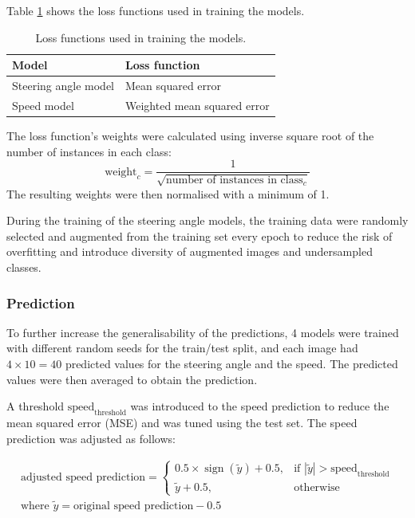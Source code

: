 \documentclass{article}
\begin{document}
Table \ref{tab:loss_functions} shows the loss functions used in training the models.

\begin{table}[H]
  \centering
  \renewcommand{\arraystretch}{1.2}
  \begin{tabular}{|l|l|}
    \hline
    \textbf{Model}       & \textbf{Loss function}      \\
    \hline
    Steering angle model & Mean squared error          \\
    Speed model          & Weighted mean squared error \\
    \hline
  \end{tabular}
  \vspace{0.5em}
  \caption{Loss functions used in training the models.}
  \label{tab:loss_functions}
\end{table}

The loss function's weights were calculated using inverse square root of the number of instances in each class:
\begin{equation}
  \text{weight}_c = \frac{1}{\sqrt{\text{number of instances in class}_c}}
  \label{eq:inverse_square_root}
\end{equation}
The resulting weights were then normalised with a minimum of 1.

During the training of the steering angle models, the training data were randomly selected and augmented from the training set every epoch to reduce the risk of overfitting and introduce diversity of augmented images and undersampled classes.


\subsubsection{Prediction}
To further increase the generalisability of the predictions, 4 models were trained with different random seeds for the train/test split, and each image had \( 4 \times 10 = 40 \) predicted values for the steering angle and the speed. The predicted values were then averaged to obtain the prediction.

A threshold \(\text{speed}_\text{threshold}\) was introduced to the speed prediction to reduce the mean squared error (MSE) and was tuned using the test set. The speed prediction was adjusted as follows:

\begin{equation}
  \begin{aligned}
    \text{adjusted speed prediction} =
    \begin{cases}
      0.5 \times \operatorname{sign}(\tilde{y}) + 0.5, & \text{if } |\tilde{y}| > \text{speed}_\text{threshold} \\
      \tilde{y} + 0.5,                                 & \text{otherwise}
    \end{cases}
    \\
    \text{where } \tilde{y} = \text{original speed prediction} - 0.5
  \end{aligned}
\end{equation}
\end{document}
